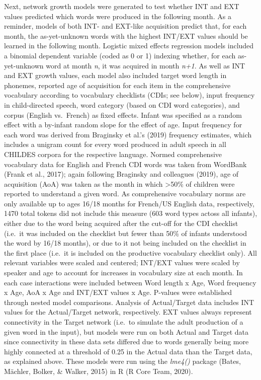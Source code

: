 \documentclass[
  man]{apa6}
\begin{document}
Next, network growth models were generated to test whether INT and EXT values predicted which words were produced in the following month. As a reminder, models of both INT- and EXT-like acquisition predict that, for each month, the as-yet-unknown words with the highest INT/EXT values should be learned in the following month.
Logistic mixed effects regression models included a binomial dependent variable (coded as 0 or 1) indexing whether, for each as-yet-unknown word at month \emph{n}, it was acquired in month \emph{n+1}. As well as INT and EXT growth values, each model also included target word length in phonemes, reported age of acquisition for each item in the comprehensive vocabulary according to vocabulary checklists (CDIs; see below), input frequency in child-directed speech, word category (based on CDI word categories), and corpus (English vs.~French) as fixed effects. Infant was specified as a random effect with a by-infant random slope for the effect of age. Input frequency for each word was derived from Braginsky et al.'s (2019) frequency estimates, which includes a unigram count for every word produced in adult speech in all CHILDES corpora for the respective language. Normed comprehensive vocabulary data for English and French CDI words was taken from WordBank (Frank et al., 2017); again following Braginsky and colleagues (2019), age of acquisition (AoA) was taken as the month in which \textgreater50\% of children were reported to understand a given word. As comprehensive vocabulary norms are only available up to ages 16/18 months for French/US English data, respectively, 1470 total tokens did not include this measure (603 word types actoss all infants), either due to the word being acquired after the cut-off for the CDI checklist (i.e.~it was included on the checklist but fewer than 50\% of infants understood the word by 16/18 months), or due to it not being included on the checklist in the first place (i.e.~it is included on the productive vocabulary checklist only). All relevant variables were scaled and centered; INT/EXT values were scaled by speaker and age to account for increases in vocabulary size at each month. In each case interactions were included between Word length x Age, Word frequency x Age, AoA x Age and INT/EXT values x Age. P-values were established through nested model comparisons. Analysis of Actual/Target data includes INT values for the Actual/Target network, respectively. EXT values always represent connectivity in the Target network (i.e.~to simulate the adult production of a given word in the input), but models were run on both Actual and Target data since connectivity in these data sets differed due to words generally being more highly connected at a threshold of 0.25 in the Actual data than the Target data, as explained above. These models were run using the \emph{lme4()} package (Bates, Mächler, Bolker, \& Walker, 2015) in R (R Core Team, 2020).
\end{document}
